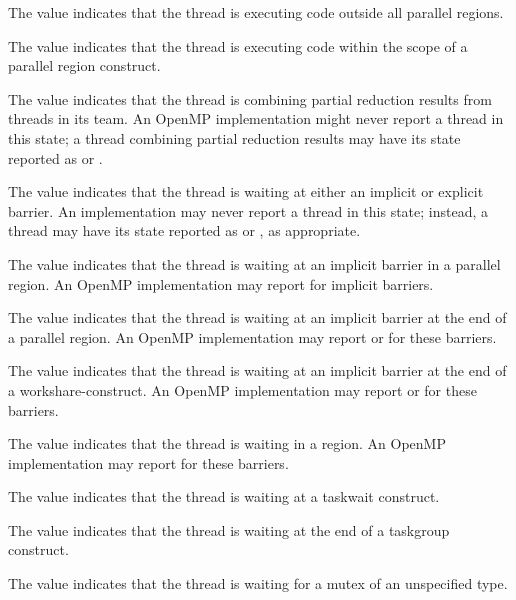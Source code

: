 The value  indicates that the thread is executing code 
outside all parallel regions.

The value  indicates that the thread is executing code 
within the scope of a parallel region construct.

The value  indicates that the thread is combining partial 
reduction results from threads in its team.
An OpenMP implementation might never report a thread in this state; a thread combining 
partial reduction results may have its state reported as  
or .

The value  indicates that the thread is waiting at either an 
implicit or explicit barrier.
An implementation may never report a thread in this state; instead, a thread may have its 
state reported as   or 
, as appropriate.

The value  indicates that the thread is waiting at 
an implicit barrier in a parallel region. An OpenMP implementation may report 
 for implicit barriers.

The value   indicates that the thread is 
waiting at an implicit barrier at the end of a parallel region. An OpenMP implementation 
may report  or  for 
these barriers.

The value   indicates that the thread is 
waiting at an implicit barrier at the end of a workshare-construct. An OpenMP 
implementation may report  or 
 for these barriers.

The value  indicates that the thread is waiting in 
a  region. An OpenMP implementation may report 
 for these barriers.

The value  indicates that the thread is waiting at a 
taskwait construct. 

The value  indicates that the thread is waiting at the end 
of a taskgroup construct. 

The value  indicates that the thread is waiting for a mutex of 
an unspecified type. 

